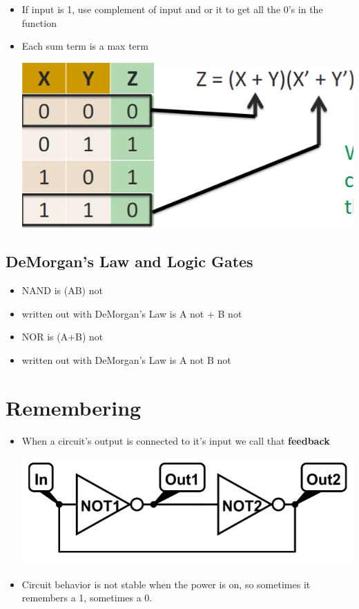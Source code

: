 \documentclass{article}
\begin{document}
\begin{itemize}
    \item If input is 1, use complement of input and or it to get all the 0's in the function
    
    \item Each sum term is a max term
    
    \includegraphics[scale=0.35]{images/maxterms.png}
\end{itemize}


\subsection{DeMorgan's Law and Logic Gates}

\begin{itemize}
    \item NAND is (AB) not
    
    \item written out with DeMorgan's Law is A not + B not
    
    \item NOR is (A+B) not
    
    \item written out with DeMorgan's Law is A not B not
    
    
\end{itemize}


\section{Remembering}

\begin{itemize}
    \item When a circuit's output is connected to it's input we call that \textbf{feedback}
    
    \includegraphics[scale=0.35]{images/feedback.png}
    
    \item Circuit behavior is not stable when the power is on, so sometimes it remembers a 1, sometimes a 0.
    

\end{itemize}
\end{document}
